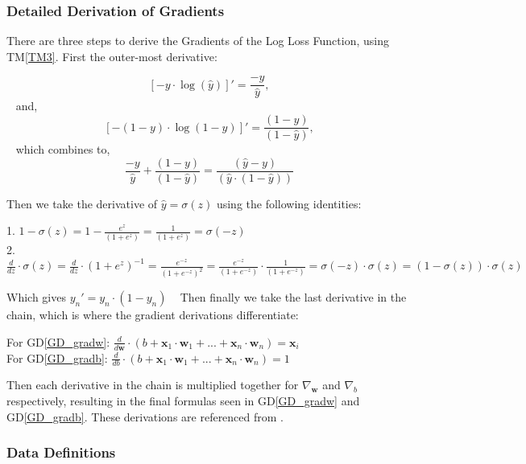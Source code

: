\documentclass[12pt]{article}
\newcommand{\dref}[1]{GD\ref{#1}}
\newcommand{\tref}[1]{TM\ref{#1}}
\begin{document}
\subsubsection*{Detailed Derivation of Gradients}

There are three steps to derive the Gradients of the Log Loss Function, using \tref{TM3}. First the outer-most derivative:
\begin{center}
  $$
    [-y \cdot \log(\hat{y})]' = \frac{-y}{\hat{y}},
  $$
  ~\newline
    and, 
    ~\newline
    $$
    [-(1 - y) \cdot \log(1 - \hat{y})]' = \frac{(1 - y)}{(1 - \hat{y})}, 
    $$
    ~\newline
    which combines to,
    ~\newline
    $$
    \frac{-y}{\hat{y}} + \frac{(1 - y)}{(1 - \hat{y})} = \frac{(\hat{y} - y)}{(\hat{y} \cdot (1 - \hat{y}))}
    $$
\end{center}
Then we take the derivative of $\hat{y} = \sigma(z)$ using the following identities:
\begin{center}
1. $ 1 - \sigma(z) = 1 - \frac{e^z}{(1 + e^z)} = \frac{1}{(1 + e^z)} = \sigma(-z)$\\
2.$ \frac{d}{dz} \cdot \sigma(z) = \frac{d}{dz} \cdot (1 + e^z)^{-1} = \frac{e^{-z}}{(1 + e^{-z})^2} = \frac{e^{-z}}{(1 + e^{-z})} \cdot \frac{1}{(1 + e^{-z})} = \sigma(-z) \cdot \sigma(z) = (1 - \sigma(z)) \cdot \sigma(z) $
\end{center}
Which gives $ y_n' = y_n \cdot (1 - y_n)$
~\newline
Then finally we take the last derivative in the chain, which is where the gradient derivations differentiate:
\begin{center}
For \dref{GD_gradw}: $ \frac{d}{d\mathbf{w}} \cdot (b + \mathbf{x}_1 \cdot \mathbf{w}_1 + ... +\mathbf{x}_n \cdot \mathbf{w}_n) = \mathbf{x}_i$ \\
For \dref{GD_gradb}: $\frac{d}{db} \cdot (b + \mathbf{x}_1 \cdot \mathbf{w}_1 + ... +\mathbf{x}_n \cdot \mathbf{w}_n) = 1 $
\end{center}

Then each derivative in the chain is multiplied together for $\nabla_\mathbf{w}$ and $\nabla_b$ respectively, resulting in
the final formulas seen in \dref{GD_gradw} and \dref{GD_gradb}. These derivations are referenced from \citet{SharmaLogReg2022}.


\subsubsection{Data Definitions}\label{sec_datadef}
\end{document}
